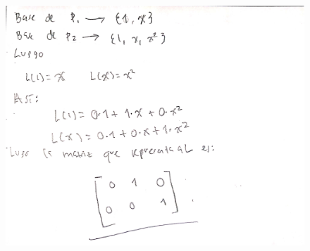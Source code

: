 \documentclass[fleqn]{article}
\begin{document}
\begin{enumerate}
\begin{itemize}
\begin{figure}[H]
             \centering \includegraphics[scale=.5]{figs/3d3}
           \end{figure}
       \end{itemize}
   \end{enumerate}
\end{document}

